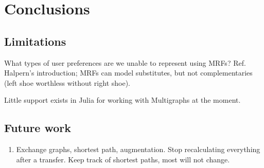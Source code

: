 \chapter{Conclusions}
\label{chap:conclusions}
\section{Limitations}
What types of user preferences are we unable to represent using MRFs? Ref. Halpern's introduction; MRFs can model substitutes, but not complementaries (left shoe worthless without right shoe).

Little support exists in Julia for working with Multigraphs at the moment.

\skelpar
\section{Future work}
\begin{enumerate}
  \item Exchange graphs, shortest path, augmentation. Stop recalculating everything after a transfer. Keep track of shortest paths, most will not change.
\end{enumerate}
\skelpar